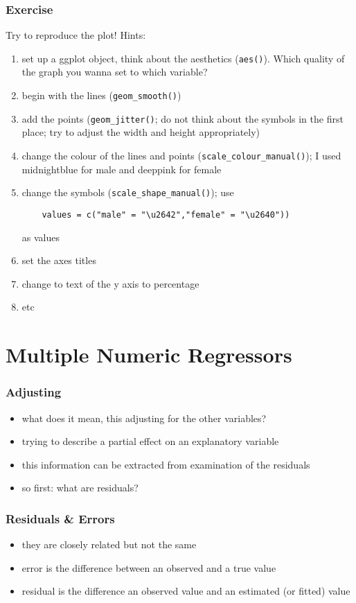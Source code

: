 \begin{frame}[fragile]\frametitle{Exercise}
Try to reproduce the plot! Hints:
  \begin{enumerate}
  \item set up a ggplot object, think about the aesthetics (\texttt{aes()}). Which quality of the graph you wanna set to which variable?
  \item begin with the lines (\texttt{geom\_smooth()})
  \item add the points (\texttt{geom\_jitter()}; do not think about the symbols in the first place; try to adjust the width and height appropriately)
  \item change the colour of the lines and points (\texttt{scale\_colour\_manual()}); I used midnightblue for male and deeppink for female
  \item change the symbols (\texttt{scale\_shape\_manual()}); use
\begin{verbatim}
    values = c("male" = "\u2642","female" = "\u2640"))
\end{verbatim}
     as values
  \item set the axes titles
  \item change to text of the y axis to percentage
  \item etc
  \end{enumerate}
\end{frame}


\section{Multiple Numeric Regressors}
\begin{frame}\frametitle{Adjusting}
  \begin{itemize}
  \item what does it mean, this adjusting for the other variables?
  \item trying to describe a partial effect on an explanatory variable
  \item this information can be extracted from examination of the residuals
  \item so first: what are residuals?
  \end{itemize}
\end{frame}


\begin{frame}\frametitle{Residuals \& Errors}
  \begin{itemize}
  \item they are closely related but not the same
  \item error is the difference between an observed and a true value
  \item residual is the difference an observed value and an estimated (or fitted) value
  \end{itemize}
\end{frame}



